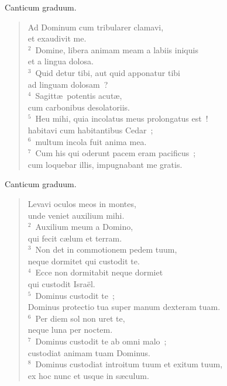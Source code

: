 \lettrine[lines=3,image=true,loversize=0.05,lraise=-0.03]{C}{}anticum graduum. \begin{flushleft}\begin{verse}\vspace{6pt}Ad Dominum cum tribularer clamavi,\\ et exaudivit me.\\
${}^{2}$~Domine, libera animam meam a labiis iniquis\\ et a lingua dolosa.\\
${}^{3}$~Quid detur tibi, aut quid apponatur tibi\\ ad linguam dolosam~?\\
${}^{4}$~Sagitt\ae\ potentis acut\ae ,\\ cum carbonibus desolatoriis.\\
${}^{5}$~Heu mihi, quia incolatus meus prolongatus est~!\\ habitavi cum habitantibus Cedar~;\\
${}^{6}$~multum incola fuit anima mea.\\
${}^{7}$~Cum his qui oderunt pacem eram pacificus~;\\ cum loquebar illis, impugnabant me gratis.\end{verse}\end{flushleft}



\lettrine[lines=3,image=true,loversize=0.05,lraise=-0.03]{C}{}anticum graduum. \begin{flushleft}\begin{verse}\vspace{6pt}Levavi oculos meos in montes,\\ unde veniet auxilium mihi.\\
${}^{2}$~Auxilium meum a Domino,\\ qui fecit c\ae lum et terram.\\
${}^{3}$~Non det in commotionem pedem tuum,\\ neque dormitet qui custodit te.\\
${}^{4}$~Ecce non dormitabit neque dormiet\\ qui custodit Isra\"el.\\
${}^{5}$~Dominus custodit te~;\\ Dominus protectio tua super manum dexteram tuam.\\
${}^{6}$~Per diem sol non uret te,\\ neque luna per noctem.\\
${}^{7}$~Dominus custodit te ab omni malo~;\\ custodiat animam tuam Dominus.\\
${}^{8}$~Dominus custodiat introitum tuum et exitum tuum,\\ ex hoc nunc et usque in s\ae culum.\end{verse}\end{flushleft}



